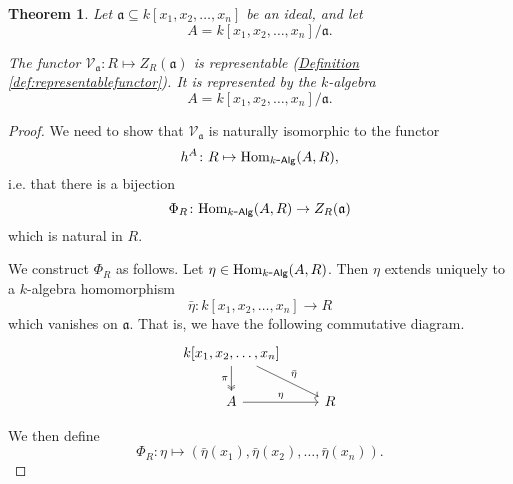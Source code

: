 \documentclass[a4paper,10pt]{scrreprt}
\newcommand{\Hom}{\mathrm{Hom}}
\def\mhyp{{\hbox{-}}}
\theoremstyle{definition}
\theoremstyle{plain}
\newtheorem{theorem}{Theorem}[section]
\theoremstyle{remark}
\begin{document}
\begin{theorem}
  \label{thm:zerosetisrepresentablefunctor}
  Let $\mathfrak{a} \subseteq k[x_{1}, x_{2}, \ldots, x_{n}]$ be an ideal, and let
  \begin{equation*}
    A = k[x_{1}, x_{2}, \ldots, x_{n}]/\mathfrak{a}.
  \end{equation*}

  The functor $\mathcal{V}_{\mathfrak{a}}\colon R \mapsto Z_{R}(\mathfrak{a})$ is representable (\hyperref[def:representablefunctor]{Definition \ref*{def:representablefunctor}}). It is represented by the $k$-algebra 
  \begin{equation*}
    A = k[x_{1}, x_{2}, \ldots, x_{n}]/\mathfrak{a}.
  \end{equation*}
\end{theorem}
\begin{proof}
  We need to show that $\mathcal{V}_{\mathfrak{a}}$ is naturally isomorphic to the functor
  \begin{equation*}
    h^{A}\colon R \mapsto \Hom_{k\mhyp\mathsf{Alg}}(A, R),
  \end{equation*}
  i.e. that there is a bijection
  \begin{equation*}
    \Phi_{R}\colon \Hom_{k\mhyp\mathsf{Alg}}(A, R) \to Z_{R}(\mathfrak{a})
  \end{equation*}
  which is natural in $R$.

  We construct $\Phi_{R}$ as follows. Let $\eta\in \Hom_{k\mhyp\mathsf{Alg}}(A, R)$. Then $\eta$ extends uniquely to a $k$-algebra homomorphism 
  \begin{equation*}
    \bar{\eta}\colon k[x_{1}, x_{2}, \ldots, x_{n}] \to R
  \end{equation*}
  which vanishes on $\mathfrak{a}$. That is, we have the following commutative diagram.
  \begin{equation*}
    \begin{tikzcd}
      k[x_{1}, x_{2}, \ldots, x_{n}]
      \arrow[d, twoheadrightarrow, swap, "\pi"]
      \arrow[dr, "\bar{\eta}"]
      \\
      A
      \arrow[r, "\eta"]
      & R
    \end{tikzcd}
  \end{equation*}

  We then define
  \begin{equation*}
    \Phi_{R}\colon \eta \mapsto (\bar{\eta}(x_{1}), \bar{\eta}(x_{2}), \ldots, \bar{\eta}(x_{n})).
  \end{equation*}


\end{proof}
\end{document}
